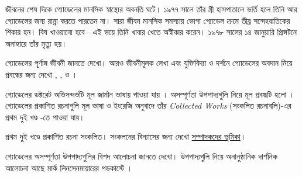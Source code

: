 \documentclass[../../../include/open-logic-section]{subfiles}
\begin{document}
জীবনের শেষ দিকে গ্যোডেলের মানসিক স্বাস্থ্যের
অবনতি ঘটে। ১৯৭৭ সালে তাঁর স্ত্রী হাসপাতালে
ভর্তি হলে তিনি আর গ্যোডেলের জন্য রান্না করতে
পারতেন না। সারা জীবন মানসিক সমস্যায় ভোগা
গ্যোডেল ক্রমে তীব্র সন্দেহবাতিকের শিকার হন।
বিষ খাওয়ানো হবে—এই ভয়ে তিনি খাবার খেতে
অস্বীকার করেন। ১৯৭৮ সালের ১৪ জানুয়ারি
প্রিন্সটনে অনাহারে তাঁর মৃত্যু হয়।

\begin{reading}
গ্যোডেলের পূর্ণাঙ্গ জীবনী জানতে \citet{Dawson1997}
দেখো। আরও জীবনীমূলক লেখা এবং যুক্তিবিদ্যা ও
দর্শনে গ্যোডেলের অবদান নিয়ে প্রবন্ধের জন্য দেখো
\citet{Wang1990}, \citet{Baaz2011},
\citet{Takeuti2003} ও \citet{Sigmund2007}।

গ্যোডেলের ডক্টরেট অভিসন্দর্ভটি মূল জার্মান ভাষায়
পাওয়া যায় \citep{Godel1929}। অসম্পূর্ণতা
উপপাদ্যগুলি নিয়ে মূল প্রবন্ধটি হলো
\citep{Godel1931}। গ্যোডেলের প্রকাশিত রচনাগুলি
মূল ভাষা ও ইংরেজি অনুবাদে তাঁর \emph{Collected Works}
(সংকলিত রচনাবলি)-এর প্রথম দুই খণ্ড
\citet{Godel1986,Godel1990}-তে পাওয়া যায়।

\par\smallskip\noindent প্রথম দুই খণ্ডে প্রকাশিত রচনা সংকলিত। সংকলনের বিন্যাসের জন্য দেখো \href{https://academic.oup.com/book/54958/chapter-abstract/422765176}{সম্পাদকদের ভূমিকা}।

গ্যোডেলের অসম্পূর্ণতা উপপাদ্যগুলির বিশদ আলোচনা
জানতে \citet{Smith2013} দেখো। উপপাদ্যগুলি নিয়ে
অনানুষ্ঠানিক দার্শনিক আলোচনা আছে মার্ক
লিনসেনমায়ারের পডকাস্টে
\citep{Linsenmayer2014}।
\end{reading}
\end{document}
